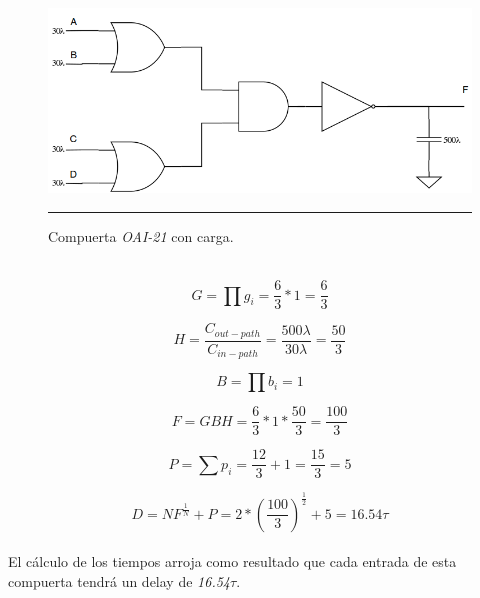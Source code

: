 \documentclass[12pt,a4paper]{article} %
\begin{document}
\begin{figure}[htbp]
  \centering
    \includegraphics[scale=0.5]{./OAI21_Cargas.png}
    \rule{35em}{0.5pt}
  \caption[IdealvsSim]{Compuerta \textit{OAI-21} con carga.}
  \label{fig:OAI21_Cargas}
\end{figure}\\


\begin{equation}\label{eqn:esfuerzo_logico2}
G= \prod g_{i}= \frac{6}{3} * 1 = \frac{6}{3}
\end{equation}

\begin{equation}\label{eqn:esfuerzo_electrico2}
H= \frac{C_{out-path}}{C_{in-path}} = \frac{500\lambda}{30\lambda} = \frac{50}{3}
\end{equation}

\begin{equation}\label{eqn:esfuerzo_enramado2}
B= \prod b_{i} = 1
\end{equation}

\begin{equation}\label{eqn:esfuerzo2}
F = GBH = \frac{6}{3}*1*\frac{50}{3} = \frac{100}{3}
\end{equation}

\begin{equation}\label{eqn:delay_parasitico2}
P = \sum p_{i} = \frac{12}{3} + 1 = \frac{15}{3} = 5
\end{equation}

\begin{equation}\label{eqn:delay2}
D = NF^{\frac{1}{N}} + P = 2*(\frac{100}{3})^{\frac{1}{2}} + 5 = 16.54\tau
\end{equation}\\

El cálculo de los tiempos arroja como resultado que cada entrada de esta compuerta tendrá un delay de \textit{16.54$\tau$}.\\
\end{document}
